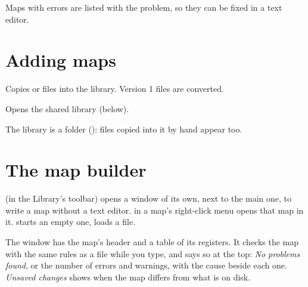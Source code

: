 Maps with errors are listed with the problem, so they can be fixed in a text
editor.

\section{Adding maps}

\begin{description}[style=nextline, leftmargin=0pt, font=\intermedium]
  \item[\ui{From a file…}] Copies  or  files into
    the library. Version 1 files are converted.
  \item[\ui{From the online library…}] Opens the shared library (below).
\end{description}

The library is a folder (): files copied into it by hand appear too.

\section{The map builder}
\label{sec:builder}

 (in the Library's toolbar) opens a window of its own, next to
the main one, to write a map without a text editor.  in a map's
right-click menu opens that map in it.  starts an empty one,
 loads a file.

The window has the map's header and a table of its registers. It checks the
map with the same rules as a file while you type, and says so at the top:
\emph{No problems found}, or the number of errors and warnings, with the
cause beside each one. \emph{Unsaved changes} shows when the map differs from
what is on disk.

